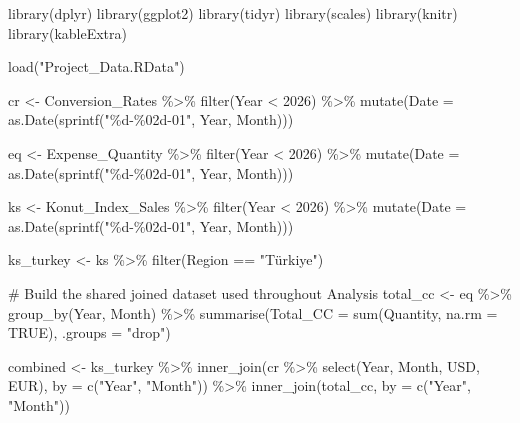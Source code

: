 \documentclass[
  11pt,
  a4paper,
]{article}
\newenvironment{Shaded}{\begin{snugshade}}{\end{snugshade}}
\newcommand{\AttributeTok}[1]{\textcolor[rgb]{0.40,0.45,0.13}{#1}}
\newcommand{\CommentTok}[1]{\textcolor[rgb]{0.37,0.37,0.37}{#1}}
\newcommand{\ConstantTok}[1]{\textcolor[rgb]{0.56,0.35,0.01}{#1}}
\newcommand{\DecValTok}[1]{\textcolor[rgb]{0.68,0.00,0.00}{#1}}
\newcommand{\FunctionTok}[1]{\textcolor[rgb]{0.28,0.35,0.67}{#1}}
\newcommand{\NormalTok}[1]{\textcolor[rgb]{0.00,0.23,0.31}{#1}}
\newcommand{\OtherTok}[1]{\textcolor[rgb]{0.00,0.23,0.31}{#1}}
\newcommand{\SpecialCharTok}[1]{\textcolor[rgb]{0.37,0.37,0.37}{#1}}
\newcommand{\StringTok}[1]{\textcolor[rgb]{0.13,0.47,0.30}{#1}}
\begin{document}
\begin{Shaded}
\begin{Highlighting}[]
\FunctionTok{library}\NormalTok{(dplyr)}
\FunctionTok{library}\NormalTok{(ggplot2)}
\FunctionTok{library}\NormalTok{(tidyr)}
\FunctionTok{library}\NormalTok{(scales)}
\FunctionTok{library}\NormalTok{(knitr)}
\FunctionTok{library}\NormalTok{(kableExtra)}

\FunctionTok{load}\NormalTok{(}\StringTok{"Project\_Data.RData"}\NormalTok{)}

\NormalTok{cr }\OtherTok{\textless{}{-}}\NormalTok{ Conversion\_Rates }\SpecialCharTok{\%\textgreater{}\%}
  \FunctionTok{filter}\NormalTok{(Year }\SpecialCharTok{\textless{}} \DecValTok{2026}\NormalTok{) }\SpecialCharTok{\%\textgreater{}\%}
  \FunctionTok{mutate}\NormalTok{(}\AttributeTok{Date =} \FunctionTok{as.Date}\NormalTok{(}\FunctionTok{sprintf}\NormalTok{(}\StringTok{"\%d{-}\%02d{-}01"}\NormalTok{, Year, Month)))}

\NormalTok{eq }\OtherTok{\textless{}{-}}\NormalTok{ Expense\_Quantity }\SpecialCharTok{\%\textgreater{}\%}
  \FunctionTok{filter}\NormalTok{(Year }\SpecialCharTok{\textless{}} \DecValTok{2026}\NormalTok{) }\SpecialCharTok{\%\textgreater{}\%}
  \FunctionTok{mutate}\NormalTok{(}\AttributeTok{Date =} \FunctionTok{as.Date}\NormalTok{(}\FunctionTok{sprintf}\NormalTok{(}\StringTok{"\%d{-}\%02d{-}01"}\NormalTok{, Year, Month)))}

\NormalTok{ks }\OtherTok{\textless{}{-}}\NormalTok{ Konut\_Index\_Sales }\SpecialCharTok{\%\textgreater{}\%}
  \FunctionTok{filter}\NormalTok{(Year }\SpecialCharTok{\textless{}} \DecValTok{2026}\NormalTok{) }\SpecialCharTok{\%\textgreater{}\%}
  \FunctionTok{mutate}\NormalTok{(}\AttributeTok{Date =} \FunctionTok{as.Date}\NormalTok{(}\FunctionTok{sprintf}\NormalTok{(}\StringTok{"\%d{-}\%02d{-}01"}\NormalTok{, Year, Month)))}

\NormalTok{ks\_turkey }\OtherTok{\textless{}{-}}\NormalTok{ ks }\SpecialCharTok{\%\textgreater{}\%} \FunctionTok{filter}\NormalTok{(Region }\SpecialCharTok{==} \StringTok{"Türkiye"}\NormalTok{)}

\CommentTok{\# Build the shared joined dataset used throughout Analysis}
\NormalTok{total\_cc }\OtherTok{\textless{}{-}}\NormalTok{ eq }\SpecialCharTok{\%\textgreater{}\%}
  \FunctionTok{group\_by}\NormalTok{(Year, Month) }\SpecialCharTok{\%\textgreater{}\%}
  \FunctionTok{summarise}\NormalTok{(}\AttributeTok{Total\_CC =} \FunctionTok{sum}\NormalTok{(Quantity, }\AttributeTok{na.rm =} \ConstantTok{TRUE}\NormalTok{), }\AttributeTok{.groups =} \StringTok{"drop"}\NormalTok{)}

\NormalTok{combined }\OtherTok{\textless{}{-}}\NormalTok{ ks\_turkey }\SpecialCharTok{\%\textgreater{}\%}
  \FunctionTok{inner\_join}\NormalTok{(cr }\SpecialCharTok{\%\textgreater{}\%} \FunctionTok{select}\NormalTok{(Year, Month, USD, EUR), }\AttributeTok{by =} \FunctionTok{c}\NormalTok{(}\StringTok{"Year"}\NormalTok{, }\StringTok{"Month"}\NormalTok{)) }\SpecialCharTok{\%\textgreater{}\%}
  \FunctionTok{inner\_join}\NormalTok{(total\_cc, }\AttributeTok{by =} \FunctionTok{c}\NormalTok{(}\StringTok{"Year"}\NormalTok{, }\StringTok{"Month"}\NormalTok{))}
\end{Highlighting}
\end{Shaded}
\end{document}
